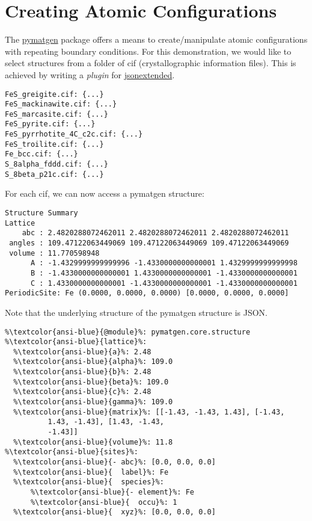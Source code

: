 \documentclass[10pt,parskip=half,
	toc=sectionentrywithdots,
	bibliography=totocnumbered,
	captions=tableheading,numbers=noendperiod]{scrartcl}
\begin{document}
\section{Creating Atomic
Configurations}\label{creating-atomic-configurations}

The \href{http://pymatgen.org/}{pymatgen} package offers a means to
create/manipulate atomic configurations with repeating boundary
conditions. For this demonstration, we would like to select structures
from a folder of cif (crystallographic information files). This is
achieved by writing a \emph{plugin} for
\href{https://github.com/chrisjsewell/jsonextended}{jsonextended}.

\begin{lstlisting}[language={},postbreak={},numbers=none,xrightmargin=7pt,belowskip=5pt,aboveskip=5pt,breakindent=0pt]
FeS_greigite.cif: {...}
FeS_mackinawite.cif: {...}
FeS_marcasite.cif: {...}
FeS_pyrite.cif: {...}
FeS_pyrrhotite_4C_c2c.cif: {...}
FeS_troilite.cif: {...}
Fe_bcc.cif: {...}
S_8alpha_fddd.cif: {...}
S_8beta_p21c.cif: {...}

\end{lstlisting}

For each cif, we can now access a pymatgen structure:

\begin{lstlisting}[language={},postbreak={},numbers=none,xrightmargin=7pt,breakindent=0pt,aboveskip=5pt,belowskip=5pt]
Structure Summary
Lattice
    abc : 2.4820288072462011 2.4820288072462011 2.4820288072462011
 angles : 109.47122063449069 109.47122063449069 109.47122063449069
 volume : 11.770598948
      A : -1.4329999999999996 -1.4330000000000001 1.4329999999999998
      B : -1.4330000000000001 1.4330000000000001 -1.4330000000000001
      C : 1.4330000000000001 -1.4330000000000001 -1.4330000000000001
PeriodicSite: Fe (0.0000, 0.0000, 0.0000) [0.0000, 0.0000, 0.0000]
\end{lstlisting}

Note that the underlying structure of the pymatgen structure is JSON.

\begin{lstlisting}[language={},postbreak={},numbers=none,xrightmargin=7pt,belowskip=5pt,aboveskip=5pt,breakindent=0pt,escapechar=\%]
%\textcolor{ansi-blue}{@class}%: Structure
%\textcolor{ansi-blue}{@module}%: pymatgen.core.structure
%\textcolor{ansi-blue}{lattice}%: 
  %\textcolor{ansi-blue}{a}%: 2.48
  %\textcolor{ansi-blue}{alpha}%: 109.0
  %\textcolor{ansi-blue}{b}%: 2.48
  %\textcolor{ansi-blue}{beta}%: 109.0
  %\textcolor{ansi-blue}{c}%: 2.48
  %\textcolor{ansi-blue}{gamma}%: 109.0
  %\textcolor{ansi-blue}{matrix}%: [[-1.43, -1.43, 1.43], [-1.43, 
          1.43, -1.43], [1.43, -1.43, 
          -1.43]]
  %\textcolor{ansi-blue}{volume}%: 11.8
%\textcolor{ansi-blue}{sites}%: 
  %\textcolor{ansi-blue}{- abc}%: [0.0, 0.0, 0.0]
  %\textcolor{ansi-blue}{  label}%: Fe
  %\textcolor{ansi-blue}{  species}%: 
      %\textcolor{ansi-blue}{- element}%: Fe
      %\textcolor{ansi-blue}{  occu}%: 1
  %\textcolor{ansi-blue}{  xyz}%: [0.0, 0.0, 0.0]

\end{lstlisting}
\end{document}
